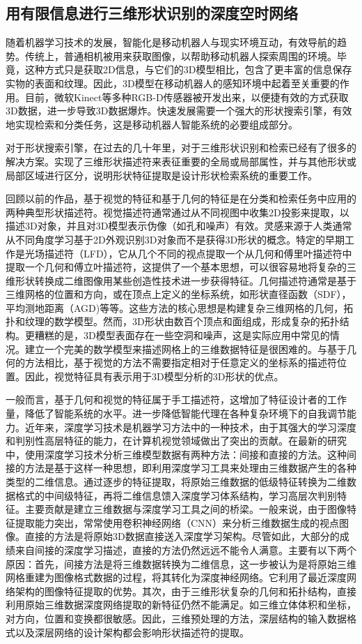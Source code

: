 \subsection{用有限信息进行三维形状识别的深度空时网络}
随着机器学习技术的发展，智能化是移动机器人与现实环境互动，有效导航的趋势。传统上，普通相机被用来获取图像，以帮助移动机器人探索周围的环境。毕竟，这种方式只是获取2D信息，与它们的3D模型相比，包含了更丰富的信息保存实物的表面和纹理。因此，3D模型在移动机器人的感知环境中起着至关重要的作用。目前，微软Kinect等多种RGB-D传感器被开发出来，以便捷有效的方式获取3D数据，进一步导致3D数据爆炸。快速发展需要一个强大的形状搜索引擎，有效地实现检索和分类任务，这是移动机器人智能系统的必要组成部分。

对于形状搜索引擎，在过去的几十年里，对于三维形状识别和检索已经有了很多的解决方案。实现了三维形状描述符来表征重要的全局或局部属性，并与其他形状或局部区域进行区分，说明形状特征提取是设计形状检索系统的重要工作。

回顾以前的作品，基于视觉的特征和基于几何的特征是在分类和检索任务中应用的两种典型形状描述符。视觉描述符通常通过从不同视图中收集2D投影来提取，以描述3D对象，并且对3D模型表示伪像（如孔和噪声）有效。灵感来源于人类通常从不同角度学习基于2D外观识别3D对象而不是获得3D形状的概念。特定的早期工作是光场描述符（LFD），它从几个不同的视点提取一个从几何和傅里叶描述符中提取一个几何和傅立叶描述符，这提供了一个基本思想，可以很容易地将复杂的三维形状转换成二维图像用某些创造性技术进一步获得特征。几何描述符通常是基于三维网格的位置和方向，或在顶点上定义的坐标系统，如形状直径函数（SDF），平均测地距离（AGD)等等。这些方法的核心思想是构建复杂三维网格的几何，拓扑和纹理的数学模型。然而，3D形状由数百个顶点和面组成，形成复杂的拓扑结构。更糟糕的是，3D模型表面存在一些空洞和噪声，这是实际应用中常见的情况。建立一个完美的数学模型来描述网格上的三维数据特征是很困难的。与基于几何的方法相比，基于视觉的方法不需要指定相对于任意定义的坐标系的描述符位置。因此，视觉特征具有表示用于3D模型分析的3D形状的优点。

一般而言，基于几何和视觉的特征属于手工描述符，这增加了特征设计者的工作量，降低了智能系统的水平。进一步降低智能代理在各种复杂环境下的自我调节能力。近年来，深度学习技术是机器学习方法中的一种技术，由于其强大的学习深度和判别性高层特征的能力，在计算机视觉领域做出了突出的贡献。在最新的研究中，使用深度学习技术分析三维模型数据有两种方法：间接和直接的方法。这种间接的方法是基于这样一种思想，即利用深度学习工具来处理由三维数据产生的各种类型的二维信息。通过逐步的特征提取，将原始三维数据的低级特征转换为二维数据格式的中间级特征，再将二维信息馈入深度学习体系结构，学习高层次判别特征。主要贡献是建立三维数据与深度学习工具之间的桥梁。一般来说，由于图像特征提取能力突出，常常使用卷积神经网络（CNN）来分析三维数据生成的视点图像。直接的方法是将原始3D数据直接送入深度学习架构。尽管如此，大部分的成绩来自间接的深度学习描述，直接的方法仍然远远不能令人满意。主要有以下两个原因：首先，间接方法是将三维数据转换为二维信息，这一步被认为是将原始三维网格重建为图像格式数据的过程，将其转化为深度神经网络。它利用了最近深度网络架构的图像特征提取的优势。其次，由于三维形状复杂的几何和拓扑结构，直接利用原始三维数据深度网络提取的新特征仍然不能满足。如三维立体体积和坐标，对方向，位置和变换都很敏感。因此，三维预处理的方法，深层结构的输入数据格式以及深层网络的设计架构都会影响形状描述符的提取。

